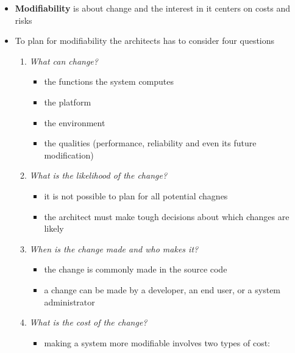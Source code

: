\documentclass[11pt]{article}
\providecommand{\tightlist}{%
      \setlength{\itemsep}{0pt}\setlength{\parskip}{0pt}}
\begin{document}
\begin{itemize}
\tightlist
\item
  \textbf{Modifiability} is about change and the interest in it centers
  on costs and risks
\item
  To plan for modifiability the architects has to consider four
  questions

  \begin{enumerate}
  \def\labelenumi{\arabic{enumi}.}
  \tightlist
  \item
    \emph{What can change?}

    \begin{itemize}
    \tightlist
    \item
      the functions the system computes
    \item
      the platform
    \item
      the environment
    \item
      the qualities (performance, reliability and even its future
      modification)
    \end{itemize}
  \item
    \emph{What is the likelihood of the change?}

    \begin{itemize}
    \tightlist
    \item
      it is not possible to plan for all potential chagnes
    \item
      the architect must make tough decisions about which changes are
      likely
    \end{itemize}
  \item
    \emph{When is the change made and who makes it?}

    \begin{itemize}
    \tightlist
    \item
      the change is commonly made in the source code
    \item
      a change can be made by a developer, an end user, or a system
      administrator
    \end{itemize}
  \item
    \emph{What is the cost of the change?}

    \begin{itemize}
    \tightlist
    \item
      making a system more modifiable involves two types of cost:


\end{itemize}
\end{enumerate}
\end{itemize}
\end{document}
